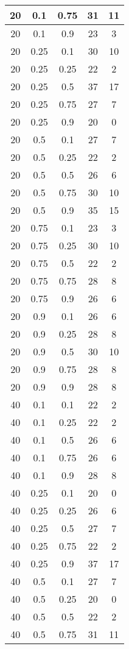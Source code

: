 \documentclass{bmstu}
\begin{document}
\begin{center}
\begin{longtable}[c]{|c|c|c|c|c|}
20 & 0.1 & 0.75 & 31 & 11 \\\hline
20 & 0.1 & 0.9 & 23 & 3 \\\hline
20 & 0.25 & 0.1 & 30 & 10 \\\hline
20 & 0.25 & 0.25 & 22 & 2 \\\hline
20 & 0.25 & 0.5 & 37 & 17 \\\hline
20 & 0.25 & 0.75 & 27 & 7 \\\hline
20 & 0.25 & 0.9 & 20 & 0 \\\hline
20 & 0.5 & 0.1 & 27 & 7 \\\hline
20 & 0.5 & 0.25 & 22 & 2 \\\hline
20 & 0.5 & 0.5 & 26 & 6 \\\hline
20 & 0.5 & 0.75 & 30 & 10 \\\hline
20 & 0.5 & 0.9 & 35 & 15 \\\hline
20 & 0.75 & 0.1 & 23 & 3 \\\hline
20 & 0.75 & 0.25 & 30 & 10 \\\hline
20 & 0.75 & 0.5 & 22 & 2 \\\hline
20 & 0.75 & 0.75 & 28 & 8 \\\hline
20 & 0.75 & 0.9 & 26 & 6 \\\hline
20 & 0.9 & 0.1 & 26 & 6 \\\hline
20 & 0.9 & 0.25 & 28 & 8 \\\hline
20 & 0.9 & 0.5 & 30 & 10 \\\hline
20 & 0.9 & 0.75 & 28 & 8 \\\hline
20 & 0.9 & 0.9 & 28 & 8 \\\hline
40 & 0.1 & 0.1 & 22 & 2 \\\hline
40 & 0.1 & 0.25 & 22 & 2 \\\hline
40 & 0.1 & 0.5 & 26 & 6 \\\hline
40 & 0.1 & 0.75 & 26 & 6 \\\hline
40 & 0.1 & 0.9 & 28 & 8 \\\hline
40 & 0.25 & 0.1 & 20 & 0 \\\hline
40 & 0.25 & 0.25 & 26 & 6 \\\hline
40 & 0.25 & 0.5 & 27 & 7 \\\hline
40 & 0.25 & 0.75 & 22 & 2 \\\hline
40 & 0.25 & 0.9 & 37 & 17 \\\hline
40 & 0.5 & 0.1 & 27 & 7 \\\hline
40 & 0.5 & 0.25 & 20 & 0 \\\hline
40 & 0.5 & 0.5 & 22 & 2 \\\hline
40 & 0.5 & 0.75 & 31 & 11 \\\hline

\end{longtable}
\end{center}
\end{document}
